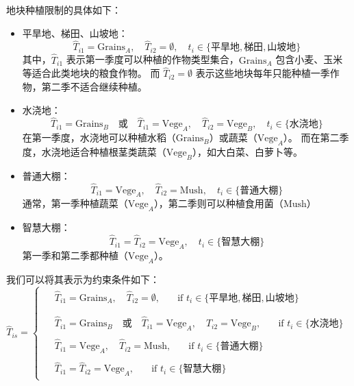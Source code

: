 \documentclass[12pt,a4paper]{nmmcm}
\begin{document}
地块种植限制的具体如下：
\begin{itemize}
  \item 平旱地、梯田、山坡地：
        \[
          \hat{T}_{i1} = \text{Grains}_A, \quad \hat{T}_{i2} = \emptyset, \quad t_i \in \{\text{平旱地}, \text{梯田}, \text{山坡地}\}
        \]
        其中，$\hat{T}_{i1}$ 表示第一季度可以种植的作物类型集合，$\text{Grains}_A$ 包含小麦、玉米等适合此类地块的粮食作物。
        而 $\hat{T}_{i2} = \emptyset$ 表示这些地块每年只能种植一季作物，第二季不适合继续种植。


  \item 水浇地：
        \[
          \hat{T}_{i1} = \text{Grains}_B \quad \text{或} \quad \hat{T}_{i1} = \text{Vege}_A, \quad \hat{T}_{i2} = \text{Vege}_B, \quad t_i \in \{\text{水浇地}\}
        \]
        在第一季度，水浇地可以种植水稻（$\text{Grains}_B$）或蔬菜（$\text{Vege}_A$）。
        而在第二季度，水浇地适合种植根茎类蔬菜（$\text{Vege}_B$），如大白菜、白萝卜等。


  \item 普通大棚：
        \[
          \hat{T}_{i1} = \text{Vege}_A, \quad \hat{T}_{i2} = \text{Mush}, \quad t_i \in \{\text{普通大棚}\}
        \]
        通常，第一季种植蔬菜（$\text{Vege}_A$），第二季则可以种植食用菌（$\text{Mush}$）



  \item 智慧大棚：
        \[
          \hat{T}_{i1} = \hat{T}_{i2} = \text{Vege}_A, \quad t_i \in \{\text{智慧大棚}\}
        \]
        第一季和第二季都种植（$\text{Vege}_A$）。

\end{itemize}

我们可以将其表示为约束条件如下：
\[
  \hat{T}_{is} =
  \begin{cases}
    \begin{aligned}
       & \hat{T}_{i1} = \text{Grains}_A, \quad \hat{T}_{i2} = \emptyset, \quad & \text{if } t_i \in \{\text{平旱地}, \text{梯田}, \text{山坡地}\} \\
    \end{aligned}                                \\
    \begin{aligned}
       & \hat{T}_{i1} = \text{Grains}_B \quad \text{或} \quad \hat{T}_{i1} = \text{Vege}_A, \quad \hat{T}_{i2} = \text{Vege}_B, \quad & \text{if } t_i \in \{\text{水浇地}\}
    \end{aligned} \\
    \begin{aligned}
       & \hat{T}_{i1} = \text{Vege}_A, \quad \hat{T}_{i2} = \text{Mush}, \quad & \text{if } t_i \in \{\text{普通大棚}\}
    \end{aligned}                                                      \\
    \begin{aligned}
       & \hat{T}_{i1} = \hat{T}_{i2} = \text{Vege}_A, \quad & \text{if } t_i \in \{\text{智慧大棚}\}
    \end{aligned}
  \end{cases}
\]
\end{document}
